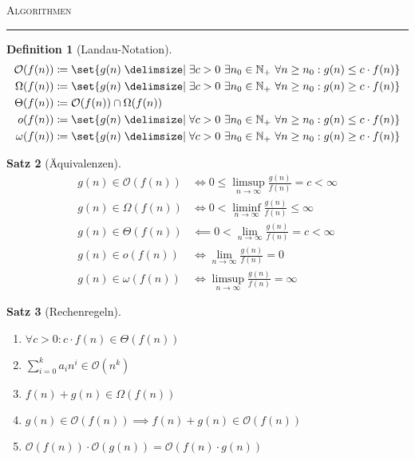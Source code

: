 \documentclass[a4paper]{article}
\newcounter{Sec}
\theoremstyle{marginbreak}
\newtheorem{definition}{Definition}[Sec]
\newtheorem{satz}[definition]{Satz}
\newcommand{\sep}{%
	\rule{\textwidth}{0.3pt}%
	\stepcounter{Sec}%
	}
\begin{document}
	\textsc{Algorithmen}

	\sep

	\begin{definition}[Landau-Notation]
		\begin{align*}
			\mathcal{O}(f(n)) &\coloneqq \set{g(n)\given\exists c>0~\exists n_0\in\mathbb{N}_{+}~\forall n\geq n_0:g(n)\leq c\cdot f(n)}\\
			\Omega(f(n)) &\coloneqq \set{g(n)\given\exists c>0~\exists n_0\in\mathbb{N}_{+}~\forall n\geq n_0:g(n)\geq c\cdot f(n)}\\
			\Theta(f(n)) &\coloneqq \mathcal{O}(f(n)) \cap \Omega(f(n))\\
			o(f(n)) &\coloneqq \set{g(n)\given\forall c>0~\exists n_0\in\mathbb{N}_{+}~\forall n\geq n_0:g(n)\leq c\cdot f(n)}\\
			\omega(f(n)) &\coloneqq \set{g(n)\given\forall c>0~\exists n_0\in\mathbb{N}_{+}~\forall n\geq n_0:g(n)\geq c\cdot f(n)}\\
		\end{align*}
	\end{definition}

	\begin{satz}[Äquivalenzen]
		\begin{align*}
			g(n)\in\mathcal{O}(f(n)) &\iff 0\leq\limsup_{n\to\infty}\frac{g(n)}{f(n)}=c<\infty\\
			g(n)\in\Omega(f(n)) &\iff 0<\liminf_{n\to\infty}\frac{g(n)}{f(n)}\leq\infty\\
			g(n)\in\Theta(f(n)) &\impliedby 0<\lim_{n\to\infty}\frac{g(n)}{f(n)}=c<\infty\\
			g(n)\in o(f(n)) &\iff \lim_{n\to\infty}\frac{g(n)}{f(n)}=0\\
			g(n)\in\omega(f(n)) &\iff \limsup_{n\to\infty}\frac{g(n)}{f(n)}=\infty
		\end{align*}
	\end{satz}

	\begin{satz}[Rechenregeln]
		\begin{enumerate}[label=(\alph*)]
			\item $\forall c>0:c\cdot f(n)\in\Theta(f(n))$
			\item $\sum_{i=0}^k a_in^i\in\mathcal{O}(n^k)$
			\item $f(n)+g(n)\in\Omega(f(n))$
			\item $g(n)\in\mathcal{O}(f(n))\implies f(n)+g(n)\in\mathcal{O}(f(n))$
			\item $\mathcal{O}(f(n))\cdot\mathcal{O}(g(n)) = \mathcal{O}(f(n)\cdot g(n))$
		\end{enumerate}
	\end{satz}
\end{document}
